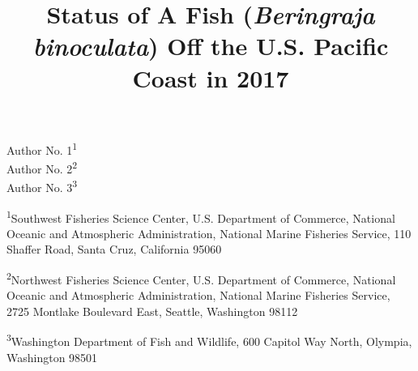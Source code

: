 \documentclass[12pt,]{article}
\title{Status of A Fish (\emph{Beringraja binoculata}) Off the U.S. Pacific
Coast in 2017}
\author{}
\date{}
\begin{document}
\maketitle


\begin{center}
\thispagestyle{empty}


\vspace{.5cm}




Author No. 1\textsuperscript{1}\\
Author No. 2\textsuperscript{2}\\
Author No. 3\textsuperscript{3}\\

\vspace{.5cm}

\small
\textsuperscript{1}Southwest Fisheries Science Center, U.S. Department of Commerce, National Oceanic and Atmospheric Administration, National Marine Fisheries Service, 110 Shaffer Road, Santa Cruz, California 95060\\

\vspace{.3cm}

\textsuperscript{2}Northwest Fisheries Science Center, U.S. Department of Commerce, National Oceanic and Atmospheric Administration, National Marine Fisheries Service, 2725 Montlake Boulevard East, Seattle, Washington 98112\\

\vspace{.3cm}

\textsuperscript{3}Washington Department of Fish and Wildlife, 600 Capitol Way North, Olympia, Washington 98501\\



\end{center}
\end{document}
